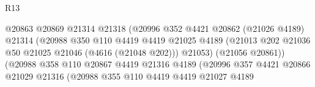 \begin{lexlean}{R13}
\begin{coremodule}
                                              @20863
                                              @20869
                                              @21314
                                              @21318
                                              (@20996
                                                @352
                                                @4421
                                                @20862
                                                (@21026 @4189)
                                                @21314
                                                (@20988
                                                  @350
                                                  @110
                                                  @4419
                                                  @4419
                                                  @21025
                                                  @4189
                                                  (@21013
                                                    @202
                                                    @21036
                                                    @50
                                                    @21025
                                                    @21046
                                                    (@4616 (@21048 @202)))
                                                  @21053)
                                                (@21056 @20861))
                                              (@20988
                                                @358
                                                @110
                                                @20867
                                                @4419
                                                @21316
                                                @4189
                                                (@20996
                                                  @357
                                                  @4421
                                                  @20866
                                                  @21029
                                                  @21316
                                                  (@20988
                                                    @355
                                                    @110
                                                    @4419
                                                    @4419
                                                    @21027
                                                    @4189

\end{coremodule}
\end{lexlean}
